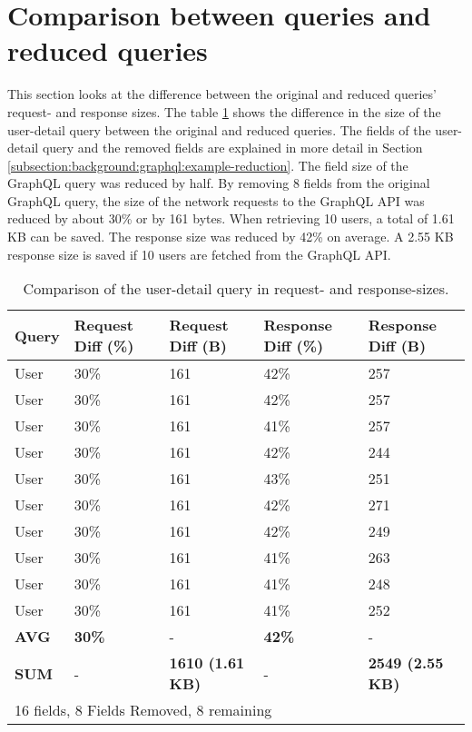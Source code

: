 \section{Comparison between queries and reduced queries}

This section looks at the difference between the original and reduced queries' request- and response sizes. The table \ref{table:code:comparison-user-reduction} shows the difference in the size of the user-detail query between the original and reduced queries. The fields of the user-detail query and the removed fields are explained in more detail in Section \ref{subsection:background:graphql:example-reduction}.
The field size of the GraphQL query was reduced by half. By removing 8 fields from the original GraphQL query, the size of the network requests to the GraphQL \ac{API} was reduced by about 30\% or by 161 bytes. When retrieving 10 users, a total of 1.61 KB can be saved. The response size was reduced by 42\% on average. A 2.55 KB response size is saved if 10 users are fetched from the GraphQL \ac{API}.

\ifshowTables
\begin{table}[H]
  \begin{tabular}{|l|l|l|l|l|}
  \hline
  \textbf{Query} & \textbf{Request Diff (\%)} & \textbf{Request Diff (B)} & \textbf{Response Diff (\%)} & \textbf{Response Diff (B)} \\
  \hline
  User & 30\% & 161 & 42\% & 257 \\
  \hline
  User & 30\% & 161 & 42\% & 257 \\
  \hline
  User & 30\% & 161 & 41\% & 257 \\
  \hline
  User & 30\% & 161 & 42\% & 244 \\
  \hline
  User & 30\% & 161 & 43\% & 251 \\
  \hline
  User & 30\% & 161 & 42\% & 271 \\
  \hline
  User & 30\% & 161 & 42\% & 249 \\
  \hline
  User & 30\% & 161 & 41\% & 263 \\
  \hline
  User & 30\% & 161 & 41\% & 248 \\
  \hline
  User & 30\% & 161 & 41\% & 252 \\
  \hline
  \hline
  \textbf{AVG} & \textbf{30\%} & - & \textbf{42\%} & -  \\
  \hline
  \hline
  \textbf{SUM} & - & \textbf{1610 (1.61 KB)} & - & \textbf{2549 (2.55 KB)} \\
  \hline
  \multicolumn{5}{l}{16 fields, 8 Fields Removed, 8 remaining}
  \end{tabular}
  \caption{Comparison of the user-detail query in request- and response-sizes.}\label{table:code:comparison-user-reduction}
\end{table}
\fi

